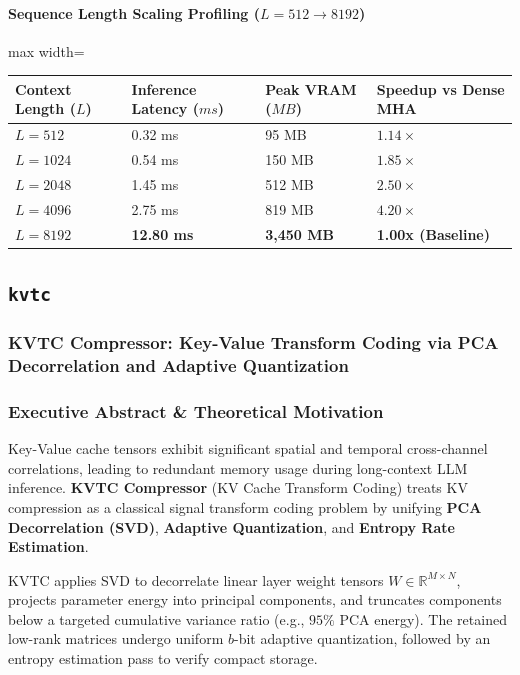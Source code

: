 \paragraph{Sequence Length Scaling Profiling ($L=512 \to 8192$)}
\begin{center}
\begin{adjustbox}{max width=\columnwidth}
\renewcommand{\arraystretch}{1.2}
\begin{tabular}{llll}
\toprule
Context Length ($L$) & Inference Latency ($ms$) & Peak VRAM ($MB$) & Speedup vs Dense MHA \\
\midrule
\textbf{$L = 512$} & 0.32 ms & 95 MB & $1.14\times$ \\
\textbf{$L = 1024$} & 0.54 ms & 150 MB & $1.85\times$ \\
\textbf{$L = 2048$} & 1.45 ms & 512 MB & $2.50\times$ \\
\textbf{$L = 4096$} & 2.75 ms & 819 MB & $4.20\times$ \\
\textbf{$L = 8192$} & \textbf{12.80 ms} & \textbf{3,450 MB} & \textbf{1.00x (Baseline)} \\


\bottomrule
\end{tabular}
\end{adjustbox}
\end{center}

\subsection{\texttt{kvtc}}
\subsubsection*{KVTC Compressor: Key-Value Transform Coding via PCA Decorrelation and Adaptive Quantization}

\subsubsection*{Executive Abstract \& Theoretical Motivation}

Key-Value cache tensors exhibit significant spatial and temporal cross-channel correlations, leading to redundant memory usage during long-context LLM inference. \textbf{KVTC Compressor} (KV Cache Transform Coding) treats KV compression as a classical signal transform coding problem by unifying \textbf{PCA Decorrelation (SVD)}, \textbf{Adaptive Quantization}, and \textbf{Entropy Rate Estimation}.

KVTC applies SVD to decorrelate linear layer weight tensors $W \in \mathbb{R}^{M \times N}$, projects parameter energy into principal components, and truncates components below a targeted cumulative variance ratio (e.g., $95\%$ PCA energy). The retained low-rank matrices undergo uniform $b$-bit adaptive quantization, followed by an entropy estimation pass to verify compact storage.

